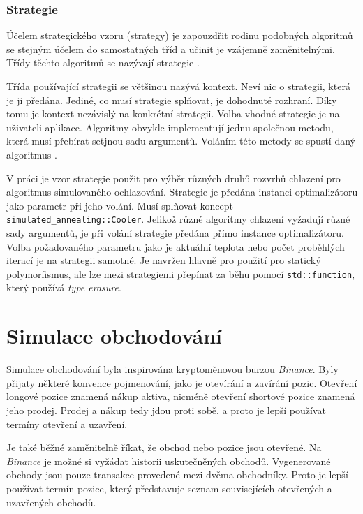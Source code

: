 \subsection{Strategie}
Účelem strategického vzoru (strategy) je zapouzdřit rodinu podobných algoritmů se stejným účelem do samostatných tříd a učinit je vzájemně zaměnitelnými.
Třídy těchto algoritmů se nazývají strategie \cite{strategy}.

Třída používající strategii se většinou nazývá kontext.
Neví nic o strategii, která je ji předána.
Jediné, co musí strategie splňovat, je dohodnuté rozhraní.
Díky tomu je kontext nezávislý na konkrétní strategii.
Volba vhodné strategie je na uživateli aplikace.
Algoritmy obvykle implementují jednu společnou metodu, která musí přebírat setjnou sadu argumentů.
Voláním této metody se spustí daný algoritmus \cite{strategy}.

V práci je vzor strategie použit pro výběr různých druhů rozvrhů chlazení pro algoritmus simulovaného ochlazování.
Strategie je předána instanci optimalizátoru jako parametr při jeho volání.
Musí splňovat koncept \texttt{simulated\_annealing::Cooler}.
Jelikož různé algoritmy chlazení vyžadují různé sady argumentů, je při volání strategie předána přímo instance optimalizátoru.
Volba požadovaného parametru jako je aktuální teplota nebo počet proběhlých iterací je na strategii samotné.
Je navržen hlavně pro použití pro statický polymorfismus, ale lze mezi strategiemi přepínat za běhu pomocí \texttt{std::function}, který používá \textit{type erasure}.

\chapter{Simulace obchodování}
Simulace obchodování byla inspirována kryptoměnovou burzou \textit{Binance}.
Byly přijaty některé konvence pojmenování, jako je otevírání a zavírání pozic.
Otevření longové pozice znamená nákup aktiva, nicméně otevření shortové pozice znamená jeho prodej.
Prodej a nákup tedy jdou proti sobě, a proto je lepší používat termíny otevření a uzavření.

Je také běžné zaměnitelně říkat, že obchod nebo pozice jsou otevřené.
Na \textit{Binance} je možné si vyžádat historii uskutečněných obchodů.
Vygenerované obchody jsou pouze transakce provedené mezi dvěma obchodníky.
Proto je lepší používat termín pozice, který představuje seznam souvisejících otevřených a uzavřených obchodů.

